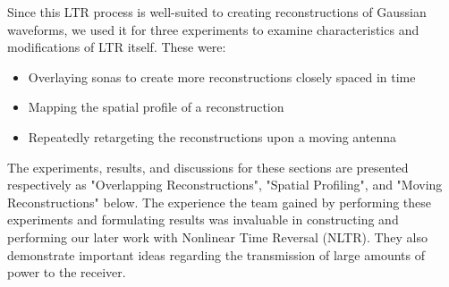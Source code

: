 Since this LTR process is well-suited to creating reconstructions of Gaussian waveforms, we used it for three experiments to examine characteristics and modifications of LTR itself. These were: 
\begin{itemize}
    \item Overlaying sonas to create more reconstructions closely spaced in time
    \item Mapping the spatial profile of a reconstruction
    \item Repeatedly retargeting the reconstructions upon a moving antenna
\end{itemize}
The experiments, results, and discussions for these sections are presented respectively as "Overlapping Reconstructions", "Spatial Profiling", and "Moving Reconstructions" below. The experience the team gained by performing these experiments and formulating results was invaluable in constructing and performing our later work with Nonlinear Time Reversal (NLTR). They also demonstrate important ideas regarding the transmission of large amounts of power to the receiver.
